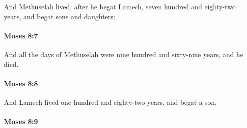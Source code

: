 			And Methuselah lived, after he begat Lamech, seven hundred and eighty-two years, and begat sons and daughters;


		\paragraph{Moses 8:7} %
			\label{MOSES-8-7}

			And all the days of Methuselah were nine hundred and sixty-nine years, and he died.


		\paragraph{Moses 8:8} %
			\label{MOSES-8-8}

			And Lamech lived one hundred and eighty-two years, and begat a son,


		\paragraph{Moses 8:9} %
			\label{MOSES-8-9}


